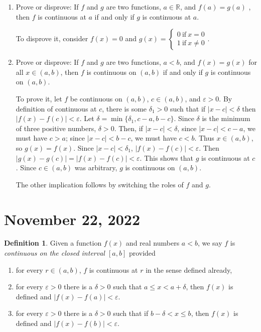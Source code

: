 \documentclass[12pt]{amsart}
\def\d{\delta}
\def\e{\varepsilon}
\newcommand{\R}{{\mathbb{R}}}
\numberwithin{equation}{section}
\theoremstyle{plain} %
\newcommand{\Nov}[1]{\section{November #1, 2022}}
\theoremstyle{definition}
\newtheorem{defn}[equation]{Definition}
\theoremstyle{remark}
\begin{document}
\begin{enumerate}
 
 \item Prove or disprove: If $f$ and $g$ are two functions, $a\in \R$, and  $f(a)=g(a)$ , then $f$ is continuous at $a$ if and only if $g$ is continuous at $a$.
 
  \begin{framed}
To disprove it, consider $f(x) = 0$ and $g(x)= \begin{cases} 0 \ \text{if} \ x=0 \\1\ \text{if} \ x\neq0 \end{cases}$.
\end{framed}

 
 \item Prove or disprove: If $f$ and $g$ are two functions, $a<b$, and  $f(x)=g(x)$ for all $x\in (a,b)$, then $f$ is continuous on $(a,b)$ if and only if $g$ is continuous on $(a,b)$.
 
   \begin{framed}
To prove it, let $f$ be continuous on $(a,b)$, $c\in (a,b)$, and $\e>0$. By definition of continuous at $c$, there is some $\d_1>0$ such that if $|x-c|<\d$ then $|f(x)-f(c)|<\e$. Let $\d = \min\{ \d_1, c-a, b-c\}$. Since $\d$ is the minimum of three positive numbers, $\d>0$. Then, if $|x-c|<\d$, since $|x-c|<c-a$, we must have $c>a$; since $|x-c|<b-c$, we must have $c<b$. Thus $x\in (a,b)$, so $g(x)=f(x)$. Since $|x-c|<\d_1$, $|f(x)-f(c)|<\e$. Then $|g(x) - g(c)| = |f(x) - f(c)| < \e$. This shows that $g$ is continuous at $c$. Since $c\in(a,b)$ was arbitrary, $g$ is continuous on $(a,b)$.

The other implication follows by switching the roles of $f$ and $g$.
\end{framed}
   \end{enumerate}
 
\Nov{22}




\begin{defn} 
 Given a function $f(x)$ and real numbers $a < b$,
we say $f$ is {\em continuous on the closed interval $[a,b]$}  provided 
\begin{enumerate}
\item for every $r \in (a,b)$, $f$ is  continuous at $r$ in the sense defined already,
\item for every $\e > 0$ there is a $\d > 0$ such that $a \leq x < a+\d$, then $f(x)$ is defined and ${|f(x)
  - f(a)| < \e}$.
\item for every $\e > 0$ there is a $\d > 0$ such that if  $b -\d < x \leq b$, then $f(x)$ is defined and ${|f(x)
  - f(b)| < \e}$.
\end{enumerate}
\end{defn}
\end{document}

